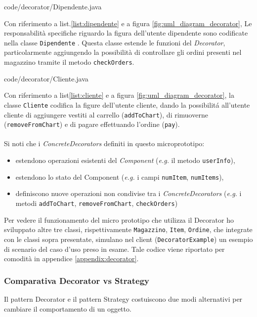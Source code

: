 \documentclass[12pt]{article}
\begin{document}

{code/decorator/Dipendente.java}

Con riferimento a list.\ref{list:dipendente} e a figura \ref{fig:uml_diagram_decorator},
Le responsabilità specifiche riguardo la figura dell'utente dipendente
sono codificate nella classe {\tt Dipendente} \cite{gof_riferimento}. Questa classe estende le funzioni del {\em Decorator}, particolarmente aggiungendo la possibilità di controllare gli ordini presenti nel magazzino tramite il metodo {\tt checkOrders}.


{code/decorator/Cliente.java}

Con riferimento a list\ref{list:cliente} e a figura \ref{fig:uml_diagram_decorator}, la classe {\tt Cliente} codifica la figure dell'utente cliente, dando la possibilit\'a all'utente cliente di aggiungere vestiti al carrello ({\tt  addToChart}), di rimuoverne ({\tt removeFromChart}) e di pagare effettuando l'ordine ({\tt pay}).
\\
\\
Si noti che i {\em ConcreteDecorators} definiti in questo microprototipo:
\begin{itemize}
    \item estendono operazioni esistenti del {\em Component} ({\em e.g.} il metodo {\tt  userInfo}),
    \item estendono lo stato del Component ({\em e.g.} i campi {\tt numItem}, {\tt numItems}),
    \item definiscono nuove operazioni non condivise tra i {\em ConcreteDecorators} ({\em e.g.} i metodi {\tt addToChart}, {\tt removeFromChart}, {\tt checkOrders})
\end{itemize}

Per vedere il funzionamento del micro prototipo che utilizza il Decorator ho sviluppato altre tre classi, rispettivamente {\tt Magazzino}, {\tt Item}, {\tt Ordine}, che integrate con le classi sopra presentate, simulano nel client ({\tt DecoratorExample}) un esempio di scenario del caso d'uso preso in esame. Tale codice viene riportato per comodità in appendice \ref{appendix:decorator}.

\subsubsection{Comparativa Decorator vs Strategy}
Il pattern Decorator e il pattern Strategy costuiscono due modi alternativi per cambiare il comportamento di un oggetto.
\end{document}
